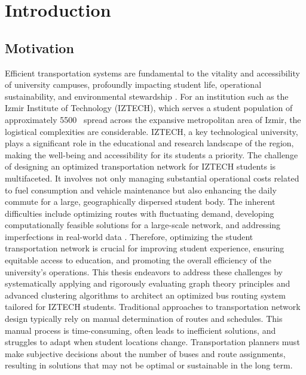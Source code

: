 \chapter{Introduction}
\label{ch:introduction}

\section{Motivation}
\label{sec:intro_motivation}
Efficient transportation systems are fundamental to the vitality and accessibility of university campuses, profoundly impacting student life, operational sustainability, and environmental stewardship \cite{dell2016campus, guido2017sustainable}. For an institution such as the Izmir Institute of Technology (IZTECH), which serves a student population of approximately 5500~\cite{iztech_info} spread across the expansive metropolitan area of Izmir, the logistical complexities are considerable. IZTECH, a key technological university, plays a significant role in the educational and research landscape of the region, making the well-being and accessibility for its students a priority. The challenge of designing an optimized transportation network for IZTECH students is multifaceted. It involves not only managing substantial operational costs related to fuel consumption and vehicle maintenance but also enhancing the daily commute for a large, geographically dispersed student body. The inherent difficulties include optimizing routes with fluctuating demand, developing computationally feasible solutions for a large-scale network, and addressing imperfections in real-world data \cite{kaviani2019smart, saberi2017models}. Therefore, optimizing the student transportation network is crucial for improving student experience, ensuring equitable access to education, and promoting the overall efficiency of the university's operations. This thesis endeavors to address these challenges by systematically applying and rigorously evaluating graph theory principles and advanced clustering algorithms to architect an optimized bus routing system tailored for IZTECH students. 
Traditional approaches to transportation network design typically rely on manual determination of routes and schedules. This manual process is time-consuming, often leads to inefficient solutions, and struggles to adapt when student locations change. Transportation planners must make subjective decisions about the number of buses and route assignments, resulting in solutions that may not be optimal or sustainable in the long term.

